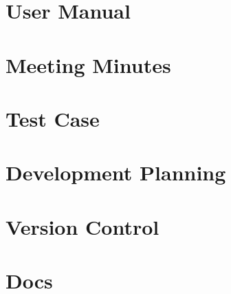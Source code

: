\appendix

\chapter{User Manual}


\chapter{Meeting Minutes}


\chapter{Test Case}


\chapter{Development Planning}


\chapter{Version Control}


\chapter{Docs}

